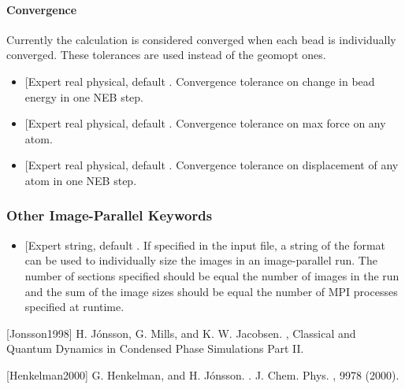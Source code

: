 \documentclass[letterpaper,10pt,english]{sphinxmanual}
\begin{document}
\paragraph{Convergence}
\label{\detokenize{nudged-elastic-band:convergence}}
Currently the calculation is considered converged when each bead is
individually converged. These tolerances are used instead of the geomopt
ones.
\begin{itemize}
\item {} 
 {[}Expert real physical, default
\sphinxcode{1.0e-5 Ha}{]}. Convergence tolerance on change in bead energy in one
NEB step.

\item {} 
 {[}Expert real physical, default
\sphinxcode{0.005 Ha/bohr}{]}. Convergence tolerance on max force on any atom.

\item {} 
 {[}Expert real physical, default
\sphinxcode{0.01 bohr}{]}. Convergence tolerance on displacement of any atom in
one NEB step.

\end{itemize}


\subsubsection{Other Image-Parallel Keywords}
\label{\detokenize{nudged-elastic-band:other-image-parallel-keywords}}\begin{itemize}
\item {} 
 {[}Expert string, default \sphinxcode{DEFAULT}{]}. If specified
in the input file, a string of the format  can be
used to individually size the images in an image-parallel run. The
number of sections specified should be equal the number of images in
the run and the sum of the image sizes should be equal the number of
MPI processes specified at runtime.

\end{itemize}

{[}Jonsson1998{]} H. Jónsson, G. Mills, and K. W. Jacobsen. , Classical and Quantum Dynamics in Condensed Phase Simulations Part II.

{[}Henkelman2000{]} G. Henkelman, and H. Jónsson. . J. Chem. Phys. , 9978 (2000).
\end{document}
